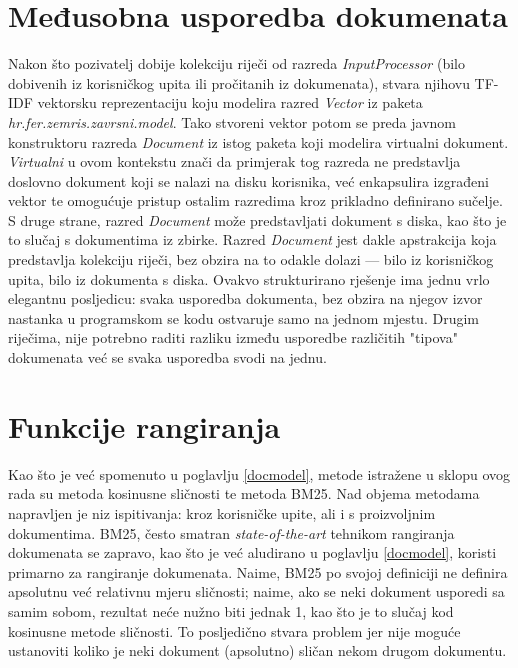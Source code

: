 \documentclass[times, utf8, zavrsni]{fer}
\begin{document}
\section{Međusobna usporedba dokumenata}
Nakon što pozivatelj dobije kolekciju riječi od razreda \textit{InputProcessor} (bilo dobivenih iz korisničkog upita ili pročitanih iz dokumenata), stvara njihovu TF-IDF vektorsku reprezentaciju koju modelira razred \textit{Vector} iz paketa \textit{hr.fer.zemris.zavrsni.model}. Tako stvoreni vektor potom se preda javnom konstruktoru razreda \textit{Document} iz istog paketa koji modelira virtualni dokument. \textit{Virtualni} u ovom kontekstu znači da primjerak tog razreda ne predstavlja doslovno dokument koji se nalazi na disku korisnika, već enkapsulira izgrađeni vektor te omogućuje pristup ostalim razredima kroz prikladno definirano sučelje. S druge strane, razred \textit{Document} može predstavljati dokument s diska, kao što je to slučaj s dokumentima iz zbirke. Razred \textit{Document} jest dakle apstrakcija koja predstavlja kolekciju riječi, bez obzira na to odakle dolazi — bilo iz korisničkog upita, bilo iz dokumenta s diska. Ovakvo strukturirano rješenje ima jednu vrlo elegantnu posljedicu: svaka usporedba dokumenta, bez obzira na njegov izvor nastanka u programskom se kodu ostvaruje samo na jednom mjestu. Drugim riječima, nije potrebno raditi razliku između usporedbe različitih "tipova" dokumenata već se svaka usporedba svodi na jednu.

\section{Funkcije rangiranja}
Kao što je već spomenuto u poglavlju \ref{docmodel}, metode istražene u sklopu ovog rada su metoda kosinusne sličnosti te metoda BM25.
Nad objema metodama napravljen je niz ispitivanja: kroz korisničke upite, ali i s proizvoljnim dokumentima. BM25, često smatran \textit{state-of-the-art} tehnikom rangiranja dokumenata se zapravo, kao što je već aludirano u poglavlju \ref{docmodel}, koristi primarno za rangiranje dokumenata. Naime, BM25 po svojoj definiciji ne definira apsolutnu već relativnu mjeru sličnosti; naime, ako se neki dokument usporedi sa samim sobom, rezultat neće nužno biti jednak 1, kao što je to slučaj kod kosinusne metode sličnosti. To posljedično stvara problem jer nije moguće ustanoviti koliko je neki dokument (apsolutno) sličan nekom drugom dokumentu.
\end{document}
